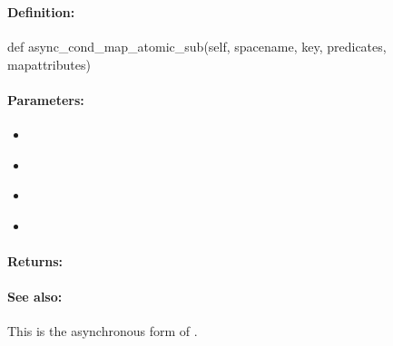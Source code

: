 \pagebreak
\subsubsection{}
\label{api:python:async_cond_map_atomic_sub}


\paragraph{Definition:}
\begin{pythoncode}
def async_cond_map_atomic_sub(self, spacename, key, predicates, mapattributes)
\end{pythoncode}

\paragraph{Parameters:}
\begin{itemize}[noitemsep]
\item {}\\

\item {}\\

\item {}\\

\item {}\\

\end{itemize}

\paragraph{Returns:}


\paragraph{See also:}  This is the asynchronous form of .

\pagebreak
\subsubsection{}
\label{api:python:map_atomic_mul}



